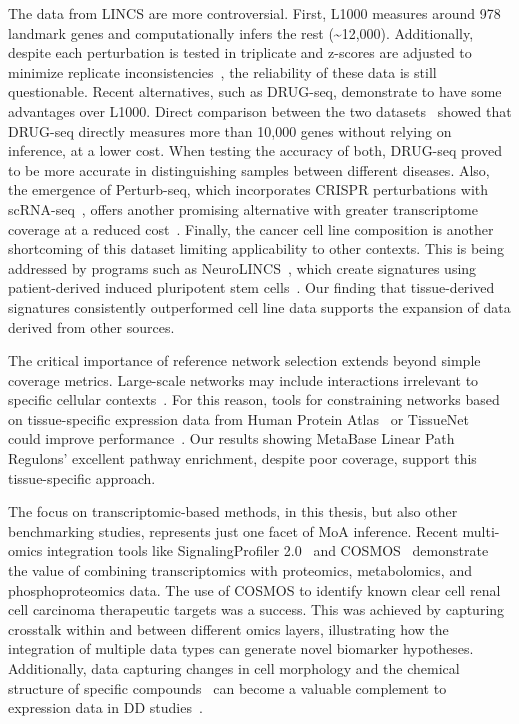 The data from \gls{LINCS} are more controversial. 
First, L1000 measures around 978 landmark genes and computationally infers the rest (\textasciitilde12,000). 
Additionally, despite each perturbation is tested in triplicate and z-scores are adjusted to minimize replicate inconsistencies~\cite{RN30}, the reliability of these data is still questionable. 
Recent alternatives, such as DRUG-seq, demonstrate to have some advantages over L1000. 
Direct comparison between the two datasets~\cite{RN130, RN105} showed that DRUG-seq directly measures more than 10,000 genes without relying on inference, at a lower cost. 
When testing the accuracy of both, DRUG-seq proved to be more accurate in distinguishing samples between different diseases. 
Also, the emergence of Perturb-seq, which incorporates \gls{CRISPR} perturbations with \gls{scRNA-seq}~\cite{RN89}, offers another promising alternative with greater transcriptome coverage at a reduced cost~\cite{RN165}. 
Finally, the cancer cell line composition is another shortcoming of this dataset limiting applicability to other contexts. 
This is being addressed by programs such as Neuro\gls{LINCS}~\cite{RN164}, which create signatures using patient-derived induced pluripotent stem cells~\cite{RN165}. 
Our finding that tissue-derived signatures consistently outperformed cell line data supports the expansion of data derived from other sources.

The critical importance of reference network selection extends beyond simple coverage metrics. 
Large-scale networks may include interactions irrelevant to specific cellular contexts~\cite{RN38}. 
For this reason, tools for constraining networks based on tissue-specific expression data from Human Protein Atlas~\cite{RN166} or TissueNet~\cite{RN137} could improve performance~\cite{RN38}. 
Our results showing MetaBase Linear Path Regulons' excellent pathway enrichment, despite poor coverage, support this tissue-specific approach.

The focus on transcriptomic-based methods, in this thesis, but also other benchmarking studies, represents just one facet of \gls{MoA} inference.
Recent multi-omics integration tools like SignalingProfiler 2.0~\cite{RN100} and COSMOS~\cite{RN99} demonstrate the value of combining transcriptomics with proteomics, metabolomics, and phosphoproteomics data. 
The use of COSMOS to identify known clear cell renal cell carcinoma therapeutic targets was a success.
This was achieved by capturing crosstalk within and between different omics layers, illustrating how the integration of multiple data types can generate novel biomarker hypotheses. 
Additionally, data capturing changes in cell morphology and the chemical structure of specific compounds~\cite{RN167} can become a valuable complement to expression data in \gls{DD} studies~\cite{RN38}. 

